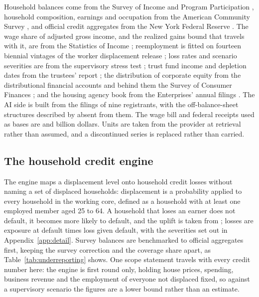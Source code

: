 Household balances come from the Survey of Income and Program Participation \citep{CensusSIPP},
household composition, earnings and occupation from the American Community Survey
\citep{CensusACS}, and official credit aggregates from the New York Federal Reserve
\citep{NYFedHHDC2026}. The wage share of adjusted gross income, and the realized gains bound that
travels with it, are from the Statistics of Income \citep{IRSSOI}; reemployment is fitted on
fourteen biennial vintages of the worker displacement release \citep{BLSWorkerDisplacement}; loss
rates and scenario severities are from the supervisory stress test \citep{FRBDFAST2026}; trust
fund income and depletion dates from the trustees' report \citep{SSATrustees2026}; the
distribution of corporate equity from the distributional financial accounts \citep{FRBDFA} and
behind them the Survey of Consumer Finances \citep{FRBSCF}; and the housing agency book from the
Enterprises' annual filings \citep{FannieMae10K2025,FreddieMac10K2025}. The AI side is built from
the filings of nine registrants, with the off-balance-sheet structures described by
\citet{BIS2026} absent from them. The wage bill and federal receipts used as bases are
 and  billion dollars. Units are taken from the provider
at retrieval rather than assumed, and a discontinued series is replaced rather than carried.

\subsection{The household credit engine}

The engine maps a displacement level onto household credit losses without naming a set of displaced households: displacement is a probability applied to every household in the working core, defined as a household with at least one employed member aged 25 to 64. A household that loses an earner does not default, it becomes more likely to default, and the uplift is taken from \citet{GerardiHerkenhoffOhanianWillen2018}; losses are exposure at default times loss given default, with the severities set out in Appendix~\ref{app:detail}. Survey balances are benchmarked to official aggregates first, keeping the survey correction and the coverage share apart, as Table~\ref{tab:underreporting} shows. One scope statement travels with every credit number here: the engine is first round only, holding house prices, spending, business revenue and the employment of everyone not displaced fixed, so against a supervisory scenario the figures are a lower bound rather than an estimate.



